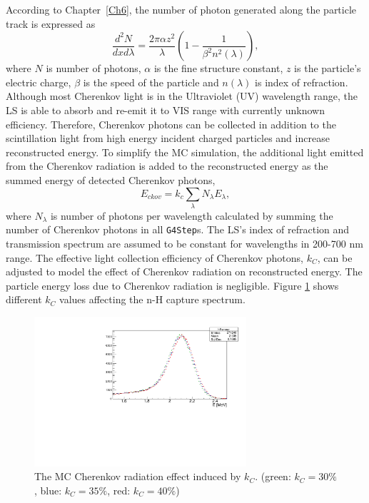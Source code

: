 According to Chapter~\ref{Ch6}, the number of photon generated along the particle track is expressed as
\begin{equation}
    \frac{d^2N}{dxd\lambda} = \frac{2\pi\alpha z^2}{\lambda}\left(1- \frac{1}{\beta^2n^2(\lambda)}\right),
    \label{eq:ckov}
\end{equation}
where $N$ is number of photons, $\alpha$ is the fine structure constant, $z$ is the particle's electric charge, $\beta$ is the speed of the particle and $n(\lambda)$ is index of refraction.
Although most Cherenkov light is in the Ultraviolet (UV) wavelength range, the LS is able to absorb and re-emit it to VIS range with currently unknown efficiency.
Therefore, Cherenkov photons can be collected in addition to the scintillation light from high energy incident charged particles and increase reconstructed energy.
To simplify the MC simulation, the additional light emitted from the Cherenkov radiation is added to the reconstructed energy as the summed energy of detected Cherenkov photons,
\begin{equation}\label{eq:ceren2}
E_{ckov} = k_{c}\sum_{\lambda}N_\lambda E_\lambda,
\end{equation}
where $N_\lambda$ is number of photons per wavelength calculated by summing the number of Cherenkov photons in all \texttt{G4Step}s.
The LS's index of refraction and transmission spectrum are assumed to be constant for wavelengths in 200-700 nm range.
The effective light collection efficiency of Cherenkov photons, $k_{C}$, can be adjusted to model the effect of Cherenkov radiation on reconstructed energy. 
The particle energy loss due to Cherenkov radiation is negligible.
Figure \ref{fig:kcplot} shows different $k_{C}$ values affecting the n-H capture spectrum.

\begin{figure}[h!]
\centering
\includegraphics[width=0.7\textwidth]{Figures/kc.pdf}
\caption[The effect of Cherenkov radiation in PG4]{The MC Cherenkov radiation effect induced by $k_{C}$. (green:  $k_{C} = 30\%$, blue: $k_{C}= 35\%$, red: $k_{C} = 40\%$)}
\label{fig:kcplot}
\end{figure}

